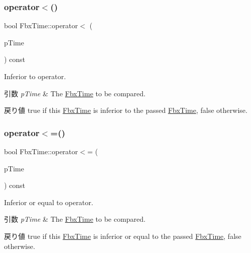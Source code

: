 \subsubsection{\texorpdfstring{operator$<$()}{operator<()}}
{\footnotesize\ttfamily bool Fbx\+Time\+::operator$<$ (\begin{DoxyParamCaption}\item[{const \hyperlink{class_fbx_time}{Fbx\+Time} \&}]{p\+Time }\end{DoxyParamCaption}) const}

Inferior to operator. 
\begin{DoxyParams}{引数}
{\em p\+Time} & The \hyperlink{class_fbx_time}{Fbx\+Time} to be compared. \\
\hline
\end{DoxyParams}
\begin{DoxyReturn}{戻り値}
{\ttfamily true} if this \hyperlink{class_fbx_time}{Fbx\+Time} is inferior to the passed \hyperlink{class_fbx_time}{Fbx\+Time}, {\ttfamily false} otherwise. 
\end{DoxyReturn}
\mbox{\label{class_fbx_time_a8d3937138e25178f4a4308e1d192620b}} 
\subsubsection{\texorpdfstring{operator$<$=()}{operator<=()}}
{\footnotesize\ttfamily bool Fbx\+Time\+::operator$<$= (\begin{DoxyParamCaption}\item[{const \hyperlink{class_fbx_time}{Fbx\+Time} \&}]{p\+Time }\end{DoxyParamCaption}) const}

Inferior or equal to operator. 
\begin{DoxyParams}{引数}
{\em p\+Time} & The \hyperlink{class_fbx_time}{Fbx\+Time} to be compared. \\
\hline
\end{DoxyParams}
\begin{DoxyReturn}{戻り値}
{\ttfamily true} if this \hyperlink{class_fbx_time}{Fbx\+Time} is inferior or equal to the passed \hyperlink{class_fbx_time}{Fbx\+Time}, {\ttfamily false} otherwise. 
\end{DoxyReturn}
\mbox{\label{class_fbx_time_aeef6e0d32d6a33499cf8a8c87723115b}} 
